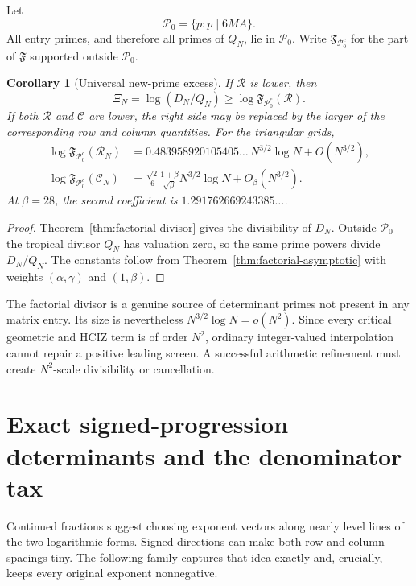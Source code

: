 \documentclass[11pt]{article}
\newcommand{\1}{\mathbf 1}
\theoremstyle{plain}
\newtheorem{corollary}[theorem]{Corollary}
\theoremstyle{definition}
\theoremstyle{remark}
\begin{document}
Let
\[
 \mathcal P_0=\{p:p\mid6MA\}.
\]
All entry primes, and therefore all primes of $Q_N$, lie in $\mathcal P_0$.
Write $\mathfrak F_{\mathcal P_0^c}$ for the part of $\mathfrak F$ supported
outside $\mathcal P_0$.

\begin{corollary}[Universal new-prime excess]\label{cor:new-prime-excess}
If $\mathcal R$ is lower, then
\[
 \Xi_N=\log(D_N/Q_N)
 \ge\log\mathfrak F_{\mathcal P_0^c}(\mathcal R).
\]
If both $\mathcal R$ and $\mathcal C$ are lower, the right side may be
replaced by the larger of the corresponding row and column quantities.  For
the triangular grids,
\begin{align}
 \log\mathfrak F_{\mathcal P_0^c}(\mathcal R_N)
 &=0.483958920105405\ldots\,N^{3/2}\log N+O(N^{3/2}),\label{eq:row-factor-coeff}\\
 \log\mathfrak F_{\mathcal P_0^c}(\mathcal C_N)
 &=\frac{\sqrt2}{6}\frac{1+\beta}{\sqrt\beta}
 N^{3/2}\log N+O_\beta(N^{3/2}).\label{eq:col-factor-coeff}
\end{align}
At $\beta=28$, the second coefficient is
$1.291762669243385\ldots$.
\end{corollary}

\begin{proof}
Theorem~\ref{thm:factorial-divisor} gives the divisibility of $D_N$.  Outside
$\mathcal P_0$ the tropical divisor $Q_N$ has valuation zero, so the same
prime powers divide $D_N/Q_N$.  The constants follow from
Theorem~\ref{thm:factorial-asymptotic} with weights $(\alpha,\gamma)$ and
$(1,\beta)$.
\end{proof}

\begin{warningbox}
The factorial divisor is a genuine source of determinant primes not present
in any matrix entry.  Its size is nevertheless
$N^{3/2}\log N=o(N^2)$.  Since every critical geometric and HCIZ term is of
order $N^2$, ordinary integer-valued interpolation cannot repair a positive
leading screen.  A successful arithmetic refinement must create
$N^2$-scale divisibility or cancellation.
\end{warningbox}

\section{Exact signed-progression determinants and the denominator tax}
\label{sec:progression}

Continued fractions suggest choosing exponent vectors along nearly level
lines of the two logarithmic forms.  Signed directions can make both row and
column spacings tiny.  The following family captures that idea exactly and,
crucially, keeps every original exponent nonnegative.
\end{document}
